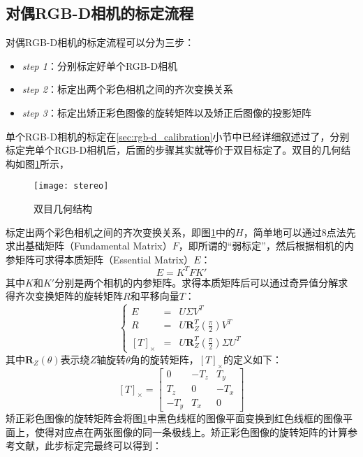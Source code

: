 \subsection{对偶RGB-D相机的标定流程}
对偶RGB-D相机的标定流程可以分为三步：
\begin{itemize}
\item \emph{step 1}：分别标定好单个RGB-D相机
\item \emph{step 2}：标定出两个彩色相机之间的齐次变换关系
\item \emph{step 3}：标定出矫正彩色图像的旋转矩阵以及矫正后图像的投影矩阵
\end{itemize}
单个RGB-D相机的标定在\ref{sec:rgb-d_calibration}小节中已经详细叙述过了，分别标定完单个RGB-D相机后，后面的步骤其实就等价于双目标定了。双目的几何结构如图\ref{fig:stereo}所示，
\begin{figure}[!ht]
  \centering
  \texttt{[image: stereo]}
  \caption{双目几何结构}
  \label{fig:stereo}
\end{figure}
标定出两个彩色相机之间的齐次变换关系，即图\ref{fig:stereo}中的$H$，简单地可以通过8点法\cite{Sur2008}先求出基础矩阵（Fundamental Matrix）$F$，即所谓的“弱标定”，然后根据相机的内参矩阵可求得本质矩阵（Essential Matrix）$E$：
\begin{equation}
  E = K^{T}FK'
\end{equation}
其中$K$和$K'$分别是两个相机的内参矩阵。求得本质矩阵后可以通过奇异值分解求得齐次变换矩阵的旋转矩阵$R$和平移向量$T$：
\begin{equation}
  \left\{\begin{array}{ccc}
    E &=& U\Sigma V^T \\
    R &=& U\bm{R}_Z^T(\frac{\pi}{2})V^T \\
    \left[T\right]_{\times} &=& U\bm{R}_Z^T(\frac{\pi}{2})\Sigma U^T
  \end{array}
  \right.
\end{equation}
其中$\bm{R}_Z(\theta)$表示绕$Z$轴旋转$\theta$角的旋转矩阵，$\left[T\right]_{\times}$的定义如下：
\begin{equation}
  \left[T\right]_{\times} = \left[
    \begin{array}{ccc}
      0&-T_z&T_y\\
      T_z&0&-T_x \\
      -T_y&T_x&0
    \end{array}
  \right]
\end{equation}
矫正彩色图像的旋转矩阵会将图\ref{fig:stereo}中黑色线框的图像平面变换到红色线框的图像平面上，使得对应点在两张图像的同一条极线上。矫正彩色图像的旋转矩阵的计算参考文献\cite{Loop2001}，此步标定完最终可以得到：
